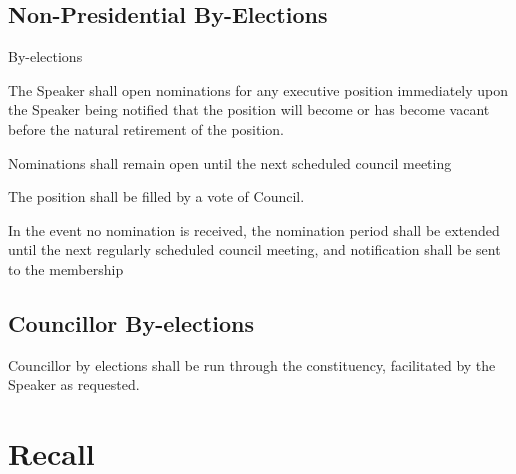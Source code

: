 \subsection {Non-Presidential By-Elections}
\begin{longenum}[ label*=\thesubsection.\arabic*., align=left]
\item By-elections
	\begin{longenum}[ label*=\arabic*., align=left]
		\item The Speaker shall open nominations for any executive position immediately upon the Speaker being
notified that the position will become or has become vacant before the natural retirement of the
position. 
		\item Nominations shall remain open until the next scheduled council meeting
		\item The position shall be filled by a vote of Council.
		\item In the event no nomination is received, the nomination period shall be extended until the next
regularly scheduled council meeting, and notification shall be sent to the membership
	\end{longenum}
\end{longenum}    
\subsection{Councillor By-elections}
\begin{longenum}[ label*=\thesubsection.\arabic*., align=left]
	\item Councillor by elections shall be run through the constituency, facilitated by the Speaker as requested.
\end{longenum}    
\newpage

\section{Recall}
